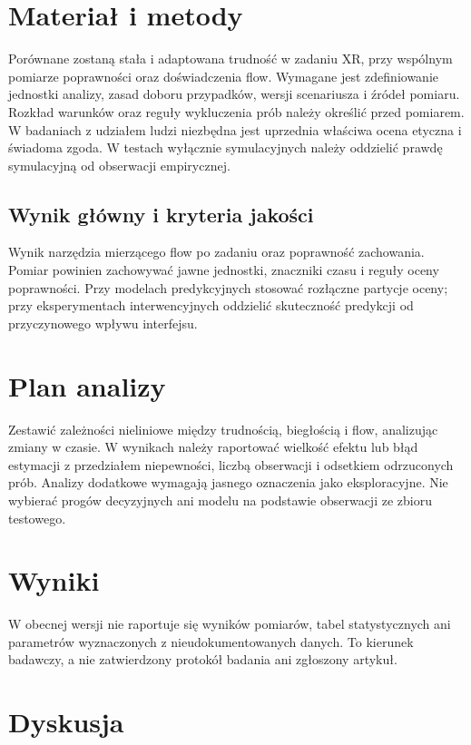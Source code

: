 \documentclass[11pt,a4paper]{article}
\begin{document}
\section{Materiał i metody}

Porównane zostaną stała i adaptowana trudność w zadaniu XR, przy wspólnym pomiarze poprawności oraz doświadczenia flow. Wymagane jest zdefiniowanie jednostki analizy, zasad doboru przypadków, wersji scenariusza i źródeł pomiaru. Rozkład warunków oraz reguły wykluczenia prób należy określić przed pomiarem. W badaniach z udziałem ludzi niezbędna jest uprzednia właściwa ocena etyczna i świadoma zgoda. W testach wyłącznie symulacyjnych należy oddzielić prawdę symulacyjną od obserwacji empirycznej.

\subsection{Wynik główny i kryteria jakości}

Wynik narzędzia mierzącego flow po zadaniu oraz poprawność zachowania. Pomiar powinien zachowywać jawne jednostki, znaczniki czasu i reguły oceny poprawności. Przy modelach predykcyjnych stosować rozłączne partycje oceny; przy eksperymentach interwencyjnych oddzielić skuteczność predykcji od przyczynowego wpływu interfejsu.

\section{Plan analizy}

Zestawić zależności nieliniowe między trudnością, biegłością i flow, analizując zmiany w czasie. W wynikach należy raportować wielkość efektu lub błąd estymacji z przedziałem niepewności, liczbą obserwacji i odsetkiem odrzuconych prób. Analizy dodatkowe wymagają jasnego oznaczenia jako eksploracyjne. Nie wybierać progów decyzyjnych ani modelu na podstawie obserwacji ze zbioru testowego.

\section{Wyniki}

W obecnej wersji nie raportuje się wyników pomiarów, tabel statystycznych ani parametrów wyznaczonych z nieudokumentowanych danych. To kierunek badawczy, a nie zatwierdzony protokół badania ani zgłoszony artykuł.

\section{Dyskusja}
\end{document}

